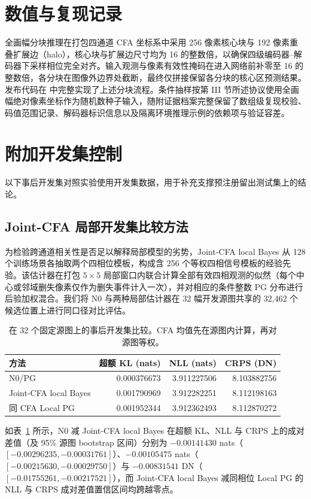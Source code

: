\documentclass[10pt,twocolumn,journal]{IEEEtran}
\begin{document}
\section{数值与复现记录}
全画幅分块推理在打包四通道 CFA 坐标系中采用 256 像素核心块与 192 像素重叠扩展边（halo），核心块与扩展边尺寸均为 16 的整数倍，以确保四级编码器--解码器下采样相位完全对齐。输入观测与像素有效性掩码在进入网络前补零至 16 的整数倍，各分块在图像外边界处截断，最终仅拼接保留各分块的核心区预测结果。发布代码在  中完整实现了上述分块流程。条件抽样按第 III 节所述协议使用全画幅绝对像素坐标作为随机数种子输入，随附证据档案完整保留了数组级复现校验、码值范围记录、解码器标识信息以及隔离环境推理示例的依赖项与验证容差。

\section{附加开发集控制}\label{sec:v3}
以下事后开发集对照实验使用开发集数据，用于补充支撑预注册留出测试集上的结论。

\subsection{Joint-CFA 局部开发集比较方法}
为检验跨通道相关性是否足以解释局部模型的劣势，Joint-CFA local Bayes 从 128 个训练场景各抽取两个四相位模板，构成含 256 个等权四相信号模板的经验先验。该估计器在打包 $5\times5$ 局部窗口内联合计算全部有效四相观测的似然（每个中心或邻域删失像素仅作为删失事件计入一次），并对相应的条件整数 PG 分布进行后验加权混合。我们将 N0 与两种局部估计器在 32 幅开发源图共享的 32,462 个候选位置上进行同口径对比评估。

\begin{table}[t]
\centering\scriptsize
\setlength{\tabcolsep}{2pt}
\caption{在 32 个固定源图上的事后开发集比较。CFA 均值先在源图内计算，再对源图等权。}
\label{tab:joint}
\begin{tabular}{@{}lrrr@{}}
\toprule
方法 & 超额 KL (nats) & NLL (nats) & CRPS (DN)\\
\midrule
N0/PG & 0.000376673 & 3.911227506 & 8.103882756\\
Joint-CFA local Bayes & 0.001790969 & 3.912282251 & 8.112198163\\
同 CFA Local PG & 0.001952344 & 3.912362493 & 8.112870272\\
\bottomrule
\end{tabular}
\end{table}

如表~\ref{tab:joint} 所示，N0 减 Joint-CFA local Bayes 在超额 KL、NLL 与 CRPS 上的成对差值（及 95\% 源图 bootstrap 区间）分别为 $-0.00141430$ nats（$[-0.00296235,-0.00031761]$）、$-0.00105475$ nats（$[-0.00215630,-0.00029750]$）与 $-0.00831541$ DN（$[-0.01755261,-0.00217521]$），而 Joint-CFA local Bayes 减同相位 Local PG 的 NLL 与 CRPS 成对差值置信区间均跨越零点。
\end{document}
